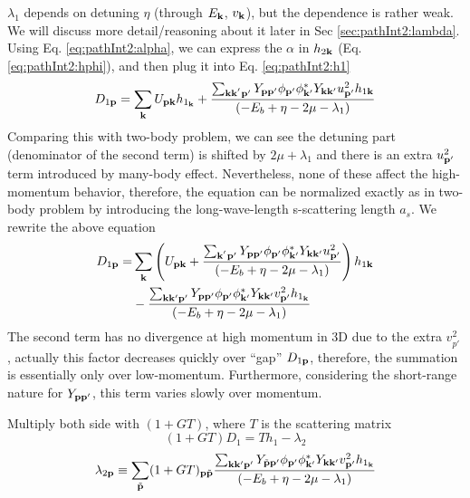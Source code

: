 $\lambda_{1}$ depends on detuning $\eta$ (through $E_{\mathbf{k}}$, $v_{\mathbf{k}}$), but the dependence is rather weak. We will discuss more detail/reasoning about it later in Sec \ref{sec:pathInt2:lambda}. 
Using Eq. \ref{eq:pathInt2:alpha}, we can express the $\alpha$ in $h_{2\mathbf{k}}$ (Eq. \ref{eq:pathInt2:hphi}), and then plug it into Eq. \ref{eq:pathInt2:h1}
\begin{equation*}
D_{1\mathbf{p}}=\sum_{\mathbf{k}}{}U_{\mathbf{p}\mathbf{k}}{h_{1_{\mathbf{k}}}}+
	\frac{\sum_{\mathbf{k}\mathbf{k}^{'}\mathbf{p}'} Y_{\mathbf{p}\mathbf{p}'}{\phi_{\mathbf{p}'}}{\phi_{\mathbf{k}'}^{*}}{Y_{\mathbf{k}\mathbf{k}'}}u_{\mathbf{p}'}^{2}{{h_{1\mathbf{k}}}}}
		{\left(-E_{b}+\eta-2\mu-\lambda_{1}\right)}
\end{equation*}
Comparing this with two-body problem, we can see the detuning part (denominator of the second term) is shifted by $2\mu+\lambda_{1}$ and there is an extra $u_{\mathbf{p}'}^{2}$ term introduced by many-body effect.  Nevertheless, none of these affect the high-momentum behavior, therefore, the equation can be normalized exactly as in two-body problem by introducing the long-wave-length s-scattering length $a_{s}$.  We rewrite the above equation
\begin{equation*}
\begin{split}
D_{1\mathbf{p}}=&\sum_{\mathbf{k}}\left(U_{\mathbf{p}\mathbf{k}}+
	\frac{\sum_{\mathbf{k}^{'}\mathbf{p}'} Y_{\mathbf{p}\mathbf{p}'}{\phi_{\mathbf{p}'}}{\phi_{\mathbf{k}'}^{*}}{Y_{\mathbf{k}\mathbf{k}'}}u_{\mathbf{p}'}^{2}}
		{\left(-E_{b}+\eta-2\mu-\lambda_{1}\right)}\right){{h_{1\mathbf{k}}}}\\
	&-\frac{\sum_{\mathbf{k}\mathbf{k}{'}\mathbf{p}'} Y_{\mathbf{p}\mathbf{p}'}{\phi_{\mathbf{p}'}}{\phi_{\mathbf{k}'}^{*}}{Y_{\mathbf{k}\mathbf{k}'}}v_{\mathbf{p}'}^{2}{h_{1_{\mathbf{k}}}}}
		{\left(-E_{b}+\eta-2\mu-\lambda_{1}\right)}{}
\end{split}
\end{equation*}
The second term has no divergence at high momentum in 3D due to the extra $v_{p'}^{2}$, actually this factor decreases quickly over ``gap'' $D_{1\mathbf{p}}$, therefore, the summation is essentially only over low-momentum.   Furthermore, considering the short-range nature for $Y_{\mathbf{p}\mathbf{p}'}$, this term varies slowly over momentum.  

Multiply both side with $(1+GT)$,  where $T$ is the scattering matrix  
\begin{equation*}
(1+GT)D_{1}=Th_{1}-\lambda_{2}
\end{equation*}
\begin{equation}\label{eq:pathInt2:lambda2}
\lambda_{2\mathbf{p}}\equiv\sum_{\tilde{\mathbf{p}}}(1+GT)_{\mathbf{p}\tilde{\mathbf{p}}}\frac{\sum_{\mathbf{k}\mathbf{k}{'}\mathbf{p}'} Y_{\tilde{\mathbf{p}}\mathbf{p}'}{\phi_{\mathbf{p}'}}{\phi_{\mathbf{k}'}^{*}}{Y_{\mathbf{k}\mathbf{k}'}}v_{\mathbf{p}'}^{2}{h_{1_{\mathbf{k}}}}}
		{\left(-E_{b}+\eta-2\mu-\lambda_{1}\right)}{}
\end{equation}

